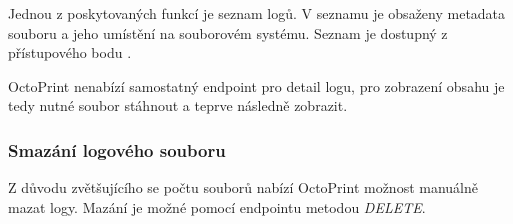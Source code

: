 Jednou z poskytovaných funkcí je seznam logů.
V seznamu je obsaženy metadata souboru a jeho umístění na souborovém systému.
Seznam je dostupný z přístupového bodu .

OctoPrint nenabízí samostatný endpoint pro detail logu, pro zobrazení obsahu je tedy nutné soubor stáhnout a teprve následně zobrazit.

\subsubsection*{Smazání logového souboru}

Z důvodu zvětšujícího se počtu souborů nabízí OctoPrint možnost manuálně mazat logy.
Mazání je možné pomocí endpointu  metodou \textit{DELETE}.
